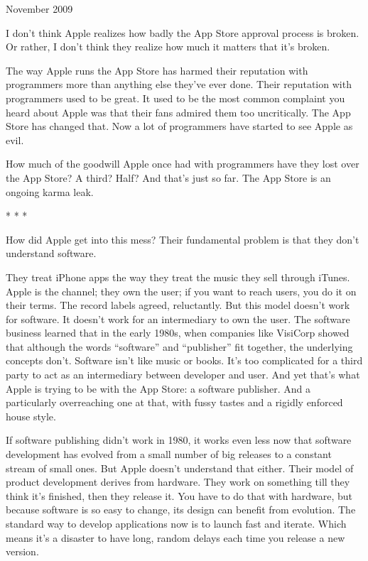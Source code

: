 November 2009

I don't think Apple realizes how badly the App Store approval process is
broken. Or rather, I don't think they realize how much it matters that
it's broken.

The way Apple runs the App Store has harmed their reputation with
programmers more than anything else they've ever done. Their reputation
with programmers used to be great. It used to be the most common
complaint you heard about Apple was that their fans admired them too
uncritically. The App Store has changed that. Now a lot of programmers
have started to see Apple as evil.

How much of the goodwill Apple once had with programmers have they lost
over the App Store? A third? Half? And that's just so far. The App Store
is an ongoing karma leak.

* * *

How did Apple get into this mess? Their fundamental problem is that they
don't understand software.

They treat iPhone apps the way they treat the music they sell through
iTunes. Apple is the channel; they own the user; if you want to reach
users, you do it on their terms. The record labels agreed, reluctantly.
But this model doesn't work for software. It doesn't work for an
intermediary to own the user. The software business learned that in the
early 1980s, when companies like VisiCorp showed that although the words
``software'' and ``publisher'' fit together, the underlying concepts
don't. Software isn't like music or books. It's too complicated for a
third party to act as an intermediary between developer and user. And
yet that's what Apple is trying to be with the App Store: a software
publisher. And a particularly overreaching one at that, with fussy
tastes and a rigidly enforced house style.

If software publishing didn't work in 1980, it works even less now that
software development has evolved from a small number of big releases to
a constant stream of small ones. But Apple doesn't understand that
either. Their model of product development derives from hardware. They
work on something till they think it's finished, then they release it.
You have to do that with hardware, but because software is so easy to
change, its design can benefit from evolution. The standard way to
develop applications now is to launch fast and iterate. Which means it's
a disaster to have long, random delays each time you release a new
version.

